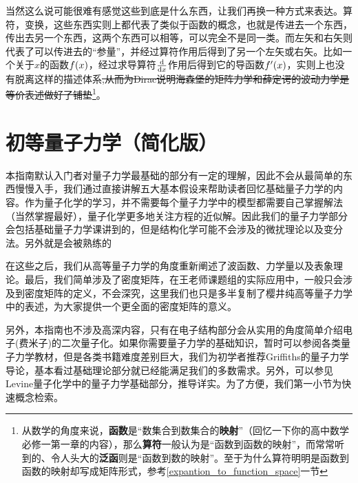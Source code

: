 \documentclass[12pt,a4paper,openany,twoside]{book}
\numberwithin{equation}{section}
\begin{document}
        当然这么说可能很难有感觉这些到底是什么东西，让我们再换一种方式来表达。算符，变换，这些东西实则上都代表了类似于函数的概念，也就是传进去一个东西，传出去另一个东西，这两个东西可以相等，可以完全不是同一类。而左矢和右矢则代表了可以传进去的“参量”，并经过算符作用后得到了另一个左矢或右矢。比如一个关于$x$的函数$f\qty(x)$，经过求导算符$\dv{x}$作用后得到它的导函数$f'\qty(x)$，实则上也没有脱离这样的描述体系\sout{,从而为Dirac说明海森堡的矩阵力学和薛定谔的波动力学是等价表述做好了铺垫}\footnote{从数学的角度来说，\textbf{函数}是“数集合到数集合的\textbf{映射}”（回忆一下你的高中数学必修一第一章的内容），那么\textbf{算符}一般认为是“函数到函数的映射”，而常常听到的、令人头大的\textbf{泛函}则是“函数到数的映射”。至于为什么算符明明是函数到函数的映射却写成矩阵形式，参考\ref{expantion_to_function_space}一节}。

    \chapter{初等量子力学（简化版）}
      本指南默认入门者对量子力学最基础的部分有一定的理解，因此不会从最简单的东西慢慢入手，我们通过直接讲解五大基本假设来帮助读者回忆基础量子力学的内容。作为量子化学的学习，并不需要每个量子力学中的模型都需要自己掌握解法（当然掌握最好），量子化学更多地关注方程的近似解。因此我们的量子力学部分会包括基础量子力学课讲到的，但是结构化学可能不会涉及的微扰理论以及变分法。另外就是会被熟练的
      
      在这些之后，我们从高等量子力学的角度重新阐述了波函数、力学量以及表象理论。最后，我们简单涉及了密度矩阵，在王老师课题组的实际应用中，一般只会涉及到密度矩阵的定义，不会深究，这里我们也只是多半复制了樱井纯高等量子力学中的表述，为大家提供一个更全面的密度矩阵的意义。
      
      另外，本指南也不涉及高深内容，只有在电子结构部分会从实用的角度简单介绍电子(费米子)的二次量子化。如果你需要量子力学的基础知识，暂时可以参阅各类量子力学教材，但是各类书籍难度差别巨大，我们为初学者推荐Griffiths的量子力学导论，基本看过基础理论部分就已经能满足我们的多数需求。另外，可以参见Levine量子化学中的量子力学基础部分，推导详实。为了方便，我们第一小节为快速概念检索。
\end{document}
